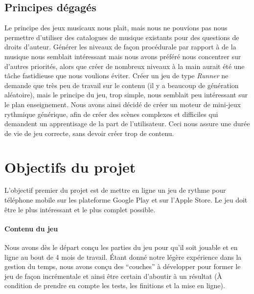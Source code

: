\subsection{Principes dégagés}
Le principe des jeux musicaux nous plait, mais nous ne pouvions pas nous permettre d'utiliser des catalogues de musique existants pour des questions de droits d'auteur. Générer les niveaux de façon procédurale par rapport à de la musique nous semblait intéressant mais nous avons préféré nous concentrer sur d'autres priorités, alors que créer de nombreux niveaux à la main aurait été une tâche fastidieuse que nous voulions éviter. Créer un jeu de type \textit{Runner} ne demande que très peu de travail sur le contenu (il y a beaucoup de génération aléatoire), mais le principe du jeu, trop simple, nous semblait peu intéressant sur le plan enseignement. Nous avons ainsi décidé de créer un moteur de mini-jeux rythmique générique, afin de créer des scènes complexes et difficiles qui demandent un apprentisage de la part de l'utilisateur. Ceci nous assure une durée de vie de jeu correcte, sans devoir créer trop de contenu.


\section{Objectifs du projet}

L'objectif premier du projet est de mettre en ligne un jeu de rythme pour téléphone mobile sur les plateforme Google Play et sur l'Apple Store. Le jeu doit être le plus intéressant et le plus complet possible.

\paragraph{Contenu du jeu}
Nous avons dès le départ conçu les parties du jeu pour qu’il soit jouable et en ligne au bout de 4 mois de travail. Étant donné notre légère expérience dans la gestion du temps, nous avons conçu des “couches” à développer pour former le jeu de façon incrémentale et ainsi être certain d’aboutir à un résultat (À condition de prendre en compte les tests, les finitions et la mise en ligne).

